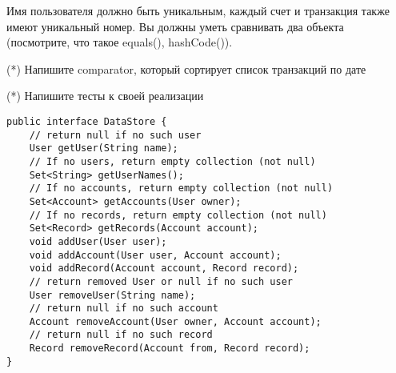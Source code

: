 \documentclass[a4paper,12pt]{extreport}
\begin{document}
\begin{enumerate}
    Имя пользователя должно быть уникальным, каждый счет и транзакция также имеют уникальный номер. Вы должны уметь сравнивать два объекта (посмотрите, что такое equals(), hashCode()). 
    
    (*) Напишите comparator, который сортирует список транзакций по дате
    
    (*) Напишите тесты к своей реализации
    
    \begin{lstlisting}
public interface DataStore {
    // return null if no such user
    User getUser(String name);
    // If no users, return empty collection (not null)
    Set<String> getUserNames();
    // If no accounts, return empty collection (not null)
    Set<Account> getAccounts(User owner);
    // If no records, return empty collection (not null)
    Set<Record> getRecords(Account account);
    void addUser(User user);
    void addAccount(User user, Account account);
    void addRecord(Account account, Record record);
    // return removed User or null if no such user
    User removeUser(String name);
    // return null if no such account
    Account removeAccount(User owner, Account account);
    // return null if no such record
    Record removeRecord(Account from, Record record);
}
    \end{lstlisting}


    
    
\end{enumerate}
    
\end{document}
